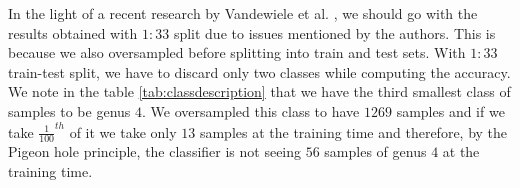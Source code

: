 \documentclass[oneside, twocolumn, a4paper, 10pt]{IEEEtran}
\begin{document}
\par
In the light of a recent research by Vandewiele et al. \cite{23}, we should go with the results obtained with $1:33$ split due to issues mentioned by the authors. This is because we also oversampled before splitting into train and test sets. With $1:33$ train-test split, we have to discard only two classes while computing the accuracy. We note in the table \autoref{tab:classdescription} that we have the third smallest class of samples to be genus $4$. We oversampled this class to have $1269$ samples and if we take $\frac{1}{100}^{th}$ of it we take only $13$ samples at the training time and therefore, by the Pigeon hole principle, the classifier is not seeing $56$ samples of genus $4$ at the training time.\\
\end{document}
